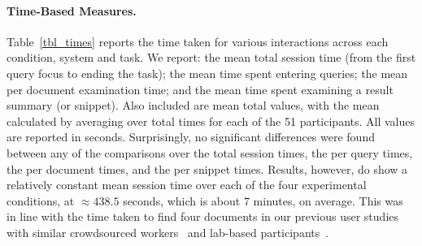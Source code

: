 \paragraph{Time-Based Measures.} Table~\ref{tbl_times} reports the time taken for various interactions across each condition, system and task. We report: the mean total session time (from the first query focus to ending the task); the mean time spent entering queries; the mean per document examination time; and the mean time spent examining a result summary (or snippet). Also included are mean total values, with the mean calculated by averaging over total times for each of the 51 participants. All values are reported in seconds. Surprisingly, no significant differences were found between any of the comparisons over the total session times, the per query times, the per document times, and the per snippet times. Results, however, do show a relatively constant mean session time over each of the four experimental conditions, at $\approx438.5$ seconds, which is about $7$ minutes, on average. This was in line with the time taken to find four documents in our previous user studies with similar crowdsourced workers~\cite{maxwell2017snippet_length} and lab-based participants~\cite{maxwell2014temporal_delays}.

